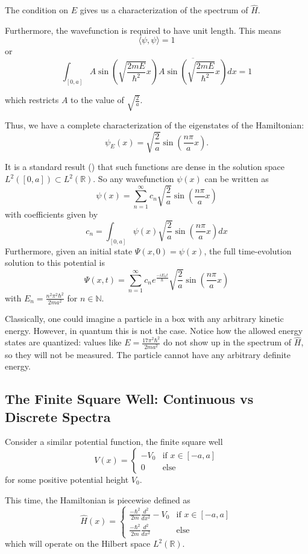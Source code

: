 The condition on $E$ gives us a characterization of the spectrum of $\hat{H}$.

Furthermore, the wavefunction is required to have unit length. This means
\[\langle \psi, \psi \rangle = 1\]
or
\[\int_{[0,a]} A\sin\left(\sqrt{\frac{2mE}{\hbar^2}}x\right)
          \overline{A\sin\left(\sqrt{\frac{2mE}{\hbar^2}}x\right)}dx = 1\]

which restricts $A$ to the value of $\sqrt{\frac{2}{a}}$.

Thus, we have a complete characterization of the eigenstates of the Hamiltonian:
\[
    \psi_E(x) = \sqrt{\frac{2}{a}}\sin\left(\frac{n\pi}{a}x\right).
\]

It is a standard result (\cite[p. 89]{Folland2009})
that such functions are dense in the solution space
$L^2([0,a]) \subset L^2(\mathbb{R})$. So any wavefunction $\psi(x)$ can be written
as
\[
    \psi(x) =
    \sum_{n=1}^{\infty} c_n \sqrt{\frac{2}{a}}\sin\left(\frac{n\pi}{a}x\right)
\]
with coefficients given by
\[
    c_n = \int_{[0,a]} \psi(x)\sqrt{\frac{2}{a}}\sin\left(\frac{n\pi}{a}x\right)dx
\]
Furthermore, given an initial state $\Psi(x,0) = \psi(x)$, the full
time-evolution solution to this potential is
\[
    \Psi(x,t) =
    \sum_{n=1}^{\infty} c_n
    e^{\frac{-iE_nt}{\hbar}}\sqrt{\frac{2}{a}}\sin\left(\frac{n\pi}{a}x\right)
\]
with $E_n = \frac{n^2\pi^2\hbar^2}{2ma^2}$ for $n\in \mathbb{N}$.

Classically, one could imagine a particle in a box with any arbitrary kinetic
energy. However, in quantum this is not the case. Notice how the allowed energy
states are quantized: values like $E = \frac{17\pi^2\hbar^2}{2ma^2}$ do not show
up in the spectrum of $\hat{H}$, so they will not be measured. The particle
cannot have any arbitrary definite energy.

\subsection{The Finite Square Well: Continuous vs Discrete Spectra}

Consider a similar potential function, the finite square well
\[
    V(x) =
    \begin{cases}
        -V_0 & \text{if } x\in[-a,a]\\
        0 & \text{else}
    \end{cases}
\]
for some positive potential height $V_0$.

This time, the Hamiltonian is piecewise defined as
\[
    \hat{H}(x) =
    \begin{cases}
        \frac{-\hbar^2}{2m}\frac{d^2}{dx^2} - V_0& \text{if } x\in[-a,a]\\
        \frac{-\hbar^2}{2m}\frac{d^2}{dx^2} &\text{else}
    \end{cases}
\]
which will operate on the Hilbert space $L^2(\mathbb{R})$.

